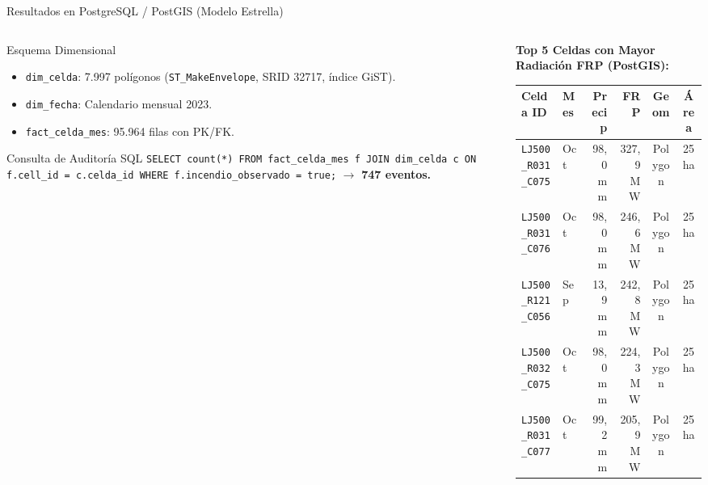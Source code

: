 \documentclass[aspectratio=169,11pt]{beamer}
\newcommand{\seccionactual}{Sustentaci\'on Final}
\begin{document}
\renewcommand{\seccionactual}{PostgreSQL}
\begin{frame}{Resultados en PostgreSQL / PostGIS (Modelo Estrella)}
  \begin{columns}
    \begin{column}{0.48\textwidth}
      \begin{block}{Esquema Dimensional}\scriptsize
        \begin{itemize}
          \item \texttt{dim\_celda}: 7.997 pol\'igonos (\texttt{ST\_MakeEnvelope}, SRID 32717, \'indice GiST).
          \item \texttt{dim\_fecha}: Calendario mensual 2023.
          \item \texttt{fact\_celda\_mes}: 95.964 filas con PK/FK.
        \end{itemize}
      \end{block}
      \vspace{0.8cm}
      \begin{exampleblock}{Consulta de Auditor\'ia SQL}\tiny
        \texttt{SELECT count(*) FROM fact\_celda\_mes f JOIN dim\_celda c ON f.cell\_id = c.celda\_id WHERE f.incendio\_observado = true;} $\to$ \textbf{747 eventos.}
      \end{exampleblock}
    \end{column}
    \begin{column}{0.48\textwidth}
      \scriptsize\textbf{Top 5 Celdas con Mayor Radiaci\'on FRP (PostGIS):}
      \begin{table}[H]
        \centering\tiny
        \begin{tabular}{@{}llrrcc@{}}
          \toprule
          \textbf{Celda ID} & \textbf{Mes} & \textbf{Precip} & \textbf{FRP} & \textbf{Geom} & \textbf{\'Area} \\
          \midrule
          \texttt{LJ500\_R031\_C075} & Oct & 98,0 mm & 327,9 MW & Polygon & 25 ha \\
          \texttt{LJ500\_R031\_C076} & Oct & 98,0 mm & 246,6 MW & Polygon & 25 ha \\
          \texttt{LJ500\_R121\_C056} & Sep & 13,9 mm & 242,8 MW & Polygon & 25 ha \\
          \texttt{LJ500\_R032\_C075} & Oct & 98,0 mm & 224,3 MW & Polygon & 25 ha \\
          \texttt{LJ500\_R031\_C077} & Oct & 99,2 mm & 205,9 MW & Polygon & 25 ha \\
          \bottomrule
        \end{tabular}
      \end{table}
    \end{column}
  \end{columns}
\end{frame}
\end{document}
